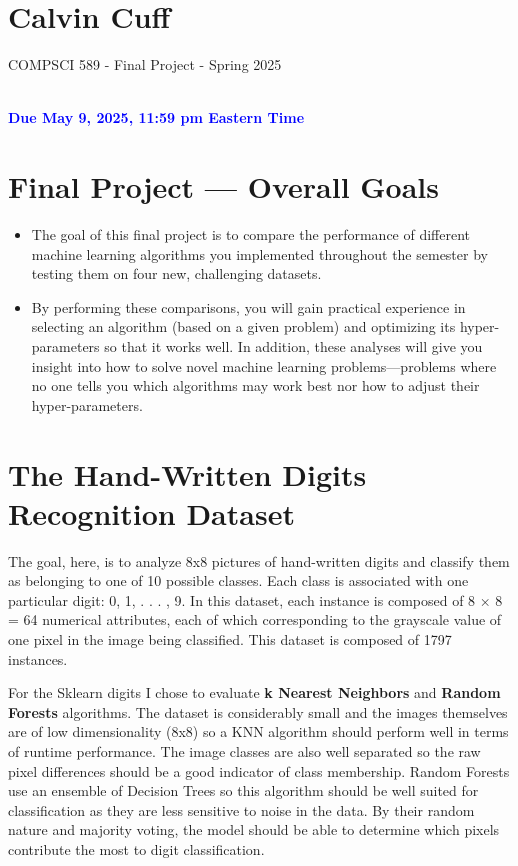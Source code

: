 \documentclass[letterpaper]{article}
\newcommand{\HIGHLIGHT}[1]{\textcolor{blue}{\textbf{#1}}}
\begin{document}
\newpage
\section*{Calvin Cuff}
\begin{center}
    \begin{Large}
    COMPSCI 589 - Final Project - Spring 2025
    \end{Large}
    \\
    \HIGHLIGHT{Due May 9, 2025, 11:59 pm Eastern Time}
\end{center}

\section{Final Project — Overall Goals}

\begin{itemize}
  \item The goal of this final project is to compare the performance of different machine learning algorithms
you implemented throughout the semester by testing them on four new, challenging datasets.
  \item By performing these comparisons, you will gain practical experience in selecting an algorithm (based on
a given problem) and optimizing its hyper-parameters so that it works well. In addition, these analyses
will give you insight into how to solve novel machine learning problems—problems where no one tells
you which algorithms may work best nor how to adjust their hyper-parameters.
\end{itemize}


\section{The Hand-Written Digits Recognition Dataset}
The goal, here, is to analyze 8x8 pictures of hand-written digits and classify them as belonging to one of 10 possible classes. Each class is associated with one particular digit: 0, 1, . . . , 9. In this dataset, each instance is composed of 8 × 8 = 64 numerical attributes, each of which corresponding to the grayscale value of one pixel in the image being classified. This dataset is composed of 1797 instances.

For the Sklearn digits I chose to evaluate \textbf{k Nearest Neighbors} and \textbf{Random Forests} algorithms. The dataset is considerably small and the images themselves are of low dimensionality (8x8) so a KNN algorithm should perform well in terms of runtime performance. The image classes are also well separated so the raw pixel differences should be a good indicator of class membership. Random Forests use an ensemble of Decision Trees so this algorithm should be well suited for classification as they are less sensitive to noise in the data. By their random nature and majority voting, the model should be able to determine which pixels contribute the most to digit classification.
\end{document}
